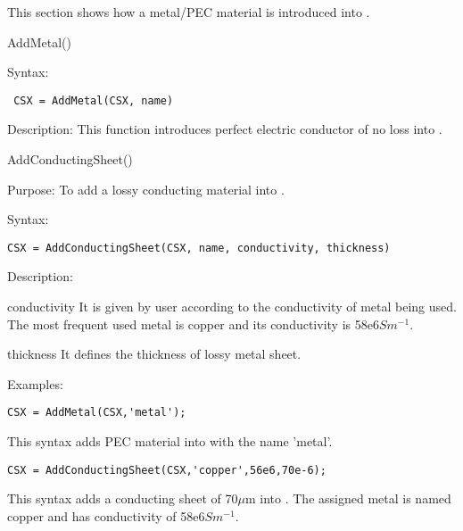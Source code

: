 This section shows how a metal/PEC material is introduced into
 \hyperref[CSX]{}.
 
\begin{FontNameFunct}{AddMetal()}
\end{FontNameFunct}

\begin{FontDescr}{Syntax:}
  \begin{lstlisting}
 CSX = AddMetal(CSX, name)
  \end{lstlisting}
\end{FontDescr}  

\begin{FontDescr}{Description:}
This function introduces perfect electric conductor of no loss into \hyperref[CSX]{}.
\end{FontDescr}

 
\begin{FontNameFunct}{AddConductingSheet()}
\end{FontNameFunct}

\begin{FontDescr}{Purpose:}
To add a lossy conducting material into \hyperref[CSX]{}.
\end{FontDescr}

\begin{FontDescr}{Syntax:}
  \begin{lstlisting}
CSX = AddConductingSheet(CSX, name, conductivity, thickness)
  \end{lstlisting}
\end{FontDescr} 

\begin{FontDescr}{Description:}

\begin{FontPara}{conductivity}
It is given by user according to the conductivity of metal being used. The most frequent used metal is copper and its conductivity is 58e6$Sm^{-1}$.    
\end{FontPara}

 \begin{FontPara}{thickness}
 It defines the thickness of lossy metal sheet.     
 \end{FontPara}
\end{FontDescr} 

\begin{FontDescr}{Examples:} 

\begin{lstlisting} 
CSX = AddMetal(CSX,'metal'); 
\end{lstlisting}
This syntax adds PEC material into \hyperref[CSX]{} with the name 'metal'. \\

\begin{lstlisting} 
CSX = AddConductingSheet(CSX,'copper',56e6,70e-6);
\end{lstlisting}
This syntax adds a conducting sheet of 70$\mu$m into \hyperref[CSX]{}. The assigned metal is named copper and has conductivity of 58e6$Sm^{-1}$.  

 \end{FontDescr} 
 
 
 
 